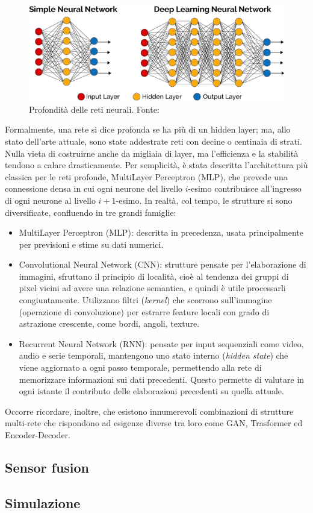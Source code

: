 \begin{figure}[h]
    \centering
    \includegraphics[width=0.6\linewidth]{immagini/deep_neural_network.png}
    \caption{Profondità delle reti neurali. Fonte: \cite{rosi2025vea}}
    \label{fig:deep_neural}
\end{figure}

Formalmente, una rete si dice profonda se ha più di un hidden layer; ma, allo stato dell'arte attuale, sono state addestrate reti con decine o centinaia di strati. Nulla vieta di costruirne anche da migliaia di layer, ma l'efficienza e la stabilità tendono a calare drasticamente. Per semplicità, è stata descritta l'architettura più classica per le reti profonde, MultiLayer Perceptron (MLP), che prevede una connessione densa in cui ogni neurone del livello $i$-esimo contribuisce all'ingresso di ogni neurone al livello  $i+1$-esimo. In realtà, col tempo, le strutture si sono diversificate, confluendo in tre grandi famiglie:
\begin{itemize}
    \item MultiLayer Perceptron (MLP): descritta in precedenza, usata principalmente per previsioni e stime su dati numerici.
    \item Convolutional Neural Network (CNN): strutture pensate per l'elaborazione di immagini, sfruttano il principio di località, cioè al tendenza dei gruppi di pixel vicini ad avere una relazione semantica, e quindi è utile processarli congiuntamente. Utilizzano filtri (\textit{kernel}) che scorrono sull'immagine (operazione di convoluzione) per estrarre feature locali con grado di astrazione crescente, come bordi, angoli, texture.
    \item Recurrent Neural Network (RNN): pensate per input sequenziali come video, audio e serie temporali, mantengono uno stato interno (\textit{hidden state}) che viene aggiornato a ogni passo temporale, permettendo alla rete di memorizzare informazioni sui dati precedenti. Questo permette di valutare in ogni istante il contributo delle elaborazioni precedenti su quella attuale.
\end{itemize}

Occorre ricordare, inoltre, che esistono innumerevoli combinazioni di strutture multi-rete che rispondono ad esigenze diverse tra loro come GAN, Trasformer ed Encoder-Decoder. 


\subsection{Sensor fusion}

\subsection{Simulazione}